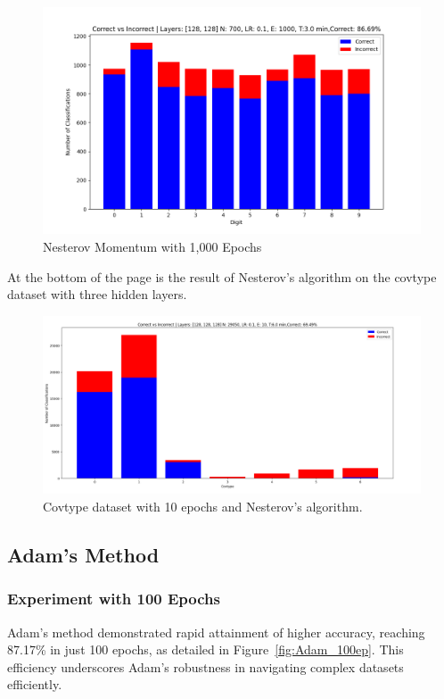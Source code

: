 \documentclass{article}
\begin{document}
\begin{figure}[h!]
    \centering
    \includegraphics[scale=0.5]{../figs/Nes_1000ep.png}
    \caption{Nesterov Momentum with 1,000 Epochs}
    \label{fig:Nes_1000ep}
\end{figure}

At the bottom of the page is the result of Nesterov's algorithm on the covtype dataset with three hidden layers.

\begin{figure}
    \centering
    \includegraphics[scale=0.2]{3.png}
    \caption{Covtype dataset with 10 epochs and Nesterov's algorithm.}
    \label{fig:enter-label}
\end{figure}

\subsection{Adam's Method}

\subsubsection{Experiment with 100 Epochs}
Adam's method demonstrated rapid attainment of higher accuracy, reaching 87.17\% in just 100 epochs, as detailed in Figure~\ref{fig:Adam_100ep}. This efficiency underscores Adam's robustness in navigating complex datasets efficiently.
\end{document}
